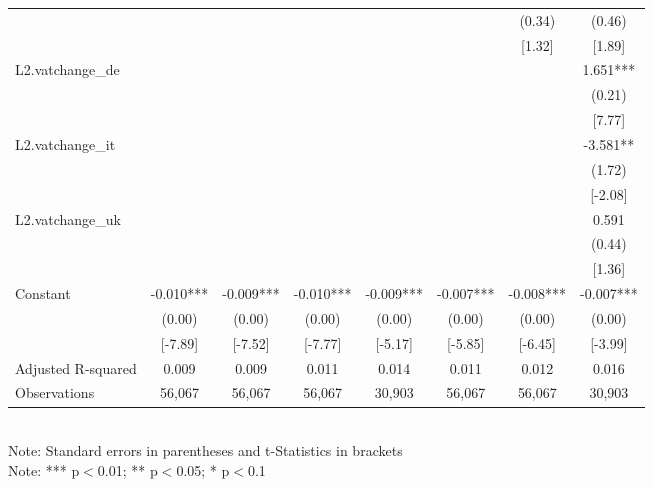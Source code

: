 \begin{table}
{\begin{tabular}{lccccccc}
			                   &           &           &           &           &           &  (0.34)   &  (0.46)   \\
			                   &           &           &           &           &           &  [1.32]   &  [1.89]   \\
			L2.vatchange\_de   &           &           &           &           &           &           & 1.651***  \\
			                   &           &           &           &           &           &           &  (0.21)   \\
			                   &           &           &           &           &           &           &  [7.77]   \\
			L2.vatchange\_it   &           &           &           &           &           &           & -3.581**  \\
			                   &           &           &           &           &           &           &  (1.72)   \\
			                   &           &           &           &           &           &           &  [-2.08]  \\
			L2.vatchange\_uk   &           &           &           &           &           &           &   0.591   \\
			                   &           &           &           &           &           &           &  (0.44)   \\
			                   &           &           &           &           &           &           &  [1.36]   \\\hline
			Constant           & -0.010*** & -0.009*** & -0.010*** & -0.009*** & -0.007*** & -0.008*** & -0.007*** \\
			                   &  (0.00)   &  (0.00)   &  (0.00)   &  (0.00)   &  (0.00)   &  (0.00)   &  (0.00)   \\
			                   &  [-7.89]  &  [-7.52]  &  [-7.77]  &  [-5.17]  &  [-5.85]  &  [-6.45]  &  [-3.99]  \\ \hline
			Adjusted R-squared &   0.009   &   0.009   &   0.011   &   0.014   &   0.011   &   0.012   &   0.016   \\
			Observations       &  56,067   &  56,067   &  56,067   &  30,903   &  56,067   &  56,067   &  30,903   \\ \hline\hline
		\end{tabular}
		\\Note: Standard errors in parentheses and t-Statistics in brackets
		\\Note: *** p$<$0.01; ** p$<$0.05; * p$<$0.1}
\end{table}
